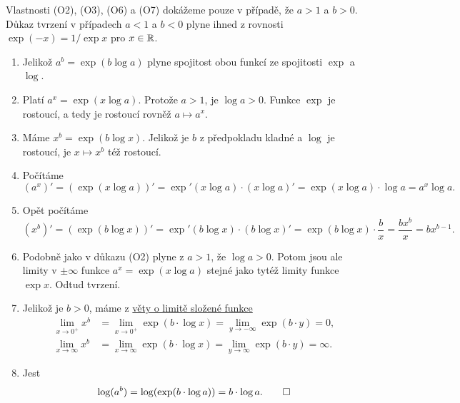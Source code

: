 \begin{propproof}
 Vlastnosti (O2), (O3), (O6) a (O7) dokážeme pouze v případě, že $a > 1$ a $b >
 0$. Důkaz tvrzení v případech $a < 1$ a $b < 0$ plyne ihned z rovnosti
 $\exp(-x) = 1 / \exp x$ pro $x \in \mathbb{R}$.
  
 \begin{enumerate}[label=(O\arabic*)]
  \item Jelikož $a^{b} = \exp(b \log a)$ plyne spojitost obou funkcí ze
   spojitosti $\exp$ a $\log$.
  \item Platí $a^{x} = \exp(x \log a)$. Protože $a > 1$, je $\log a > 0$. Funkce
   $\exp$ je rostoucí, a tedy je rostoucí rovněž $a \mapsto a^{x}$.
  \item Máme $x^{b} = \exp(b \log x)$. Jelikož je $b$ z předpokladu kladné a
   $\log$ je rostoucí, je $x \mapsto x^{b}$ též rostoucí.
  \item Počítáme
   \[
    (a^{x})' = (\exp(x \log a))' = \exp'(x \log a) \cdot (x \log a)' = \exp(x
    \log a) \cdot \log a = a^{x} \log a.
   \]
  \item Opět počítáme
   \[
    (x^{b})' = (\exp(b\log x))' = \exp'(b \log x) \cdot (b\log x)' = \exp(b \log
    x) \cdot \frac{b}{x} = \frac{bx^{b}}{x} = bx^{b-1}.
   \]
  \item Podobně jako v důkazu (O2) plyne z $a > 1$, že $\log a > 0$. Potom jsou
   ale limity v $ \pm \infty$ funkce $a^{x} = \exp(x \log a)$ stejné jako tytéž
   limity funkce $\exp x$. Odtud tvrzení.
  \item Jelikož je $b > 0$, máme z \hyperref[thm:limita-slozene-funkce]{věty o
   limitě složené funkce} 
   \begin{align*}
    \lim_{x \to 0^{+}} x^{b} &= \lim_{x \to 0^{+}} \exp(b \cdot \log x) = \lim_{y
    \to -\infty} \exp(b \cdot y) = 0,\\
     \lim_{x \to \infty} x^{b} &= \lim_{x \to \infty} \exp(b \cdot \log x) =
     \lim_{y \to \infty} \exp(b \cdot y) = \infty.
   \end{align*}
  \item Jest
   \[
    \log(a^{b}) = \log(\exp(b \cdot \log a)) = b \cdot \log a. \qedhere
   \]
 \end{enumerate}
\end{propproof}
